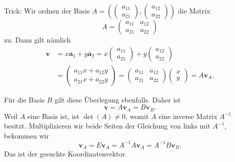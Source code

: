 \documentclass[9pt]{beamer}
\newcommand{\bv}[1]{\mathbf{#1}}
\begin{document}
\begin{frame}[t]
\vspace{4em}
Trick: Wir ordnen der Basis
$A=(\begin{pmatrix}a_{11}\\ a_{21}\end{pmatrix},
\begin{pmatrix}a_{12}\\ a_{22}\end{pmatrix})$
die Matrix
\[A=\begin{pmatrix}a_{11} & a_{12}\\ a_{21} & a_{22}\end{pmatrix}\]
zu.\pause{} Dann gilt nämlich
\begin{align*}
\bv v &= x\bv a_1 + y\bv a_2 = x\begin{pmatrix}a_{11}\\ a_{21}\end{pmatrix}
+ y\begin{pmatrix}a_{12}\\ a_{22}\end{pmatrix}\\
&= \begin{pmatrix}a_{11}x + a_{12}y\\ a_{21}x + a_{22}y\end{pmatrix}
= \begin{pmatrix}a_{11} & a_{12}\\ a_{21} & a_{22}\end{pmatrix}\begin{pmatrix}x\\ y\end{pmatrix}
= A\bv v_A.
\end{align*}
\end{frame}

\begin{frame}
Für die Basis $B$ gilt diese Überlegung ebenfalls. Daher ist
\[\bv v = A\bv v_A = B\bv v_B.\]\pause
Weil $A$ eine Basis ist, ist $\det(A)\ne 0$, womit $A$ eine
inverse Matrix $A^{-1}$ besitzt. Multiplizieren wir beide Seiten
der Gleichung von links mit $A^{-1}$, bekommen wir
\[\bv v_A = E\bv v_A = A^{-1}A\bv v_A = A^{-1}B\bv v_B.\]
Das ist der gesuchte Koordinatenvektor.
\end{frame}
\end{document}
